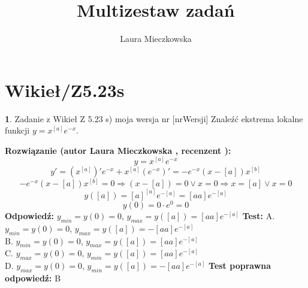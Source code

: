 \documentclass[12pt, a4paper]{article}
\title{Multizestaw zadań}
\author{Laura Mieczkowska}
\date{}
\theoremstyle{definition} %
\newtheorem{zad}{}
\newcommand{\kategoria}[1]{\section{#1}} %
\newcommand{\zadStart}[1]{\begin{zad}#1\newline} %
\newcommand{\zadStop}{\end{zad}}   %
\newcommand{\rozwStart}[2]{\noindent \textbf{Rozwiązanie (autor #1 , recenzent #2): }\newline} %
\newcommand{\odpStart}{\noindent \textbf{Odpowiedź:}\newline}    %
\newcommand{\odpStop}{\newline}                                             %
\newcommand{\testStart}{\noindent \textbf{Test:}\newline} %
\newcommand{\testStop}{\newline} %
\newcommand{\kluczStart}{\noindent \textbf{Test poprawna odpowiedź:}\newline} %
\newcommand{\kluczStop}{\newline} %
\begin{document}
\maketitle


\kategoria{Wikieł/Z5.23s}
\zadStart{Zadanie z Wikieł Z 5.23 s) moja wersja nr [nrWersji]}
Znaleźć ekstrema lokalne funkcji $y=x^{[a]}e^{-x}$.
\zadStop
\rozwStart{Laura Mieczkowska}{}
$$y=x^{[a]}e^{-x}$$
$$y'=(x^{[a]})'e^{-x}+x^{[a]}(e^{-x})'=-e^{-x}(x-[a])x^{[b]}$$
$$-e^{-x}(x-[a])x^{[b]}=0 \Rightarrow (x-[a])=0 \vee x=0 \Rightarrow x=[a] \vee x=0$$
$$y([a])=[a]^{[a]}e^{-[a]}=[aa]e^{-[a]}$$
$$y(0)=0\cdot e^{0}=0$$
\odpStart
$y_{min}=y(0)=0$, $y_{max}=y([a])=[aa]e^{-[a]}$
\odpStop
\testStart
A. $y_{min}=y(0)=0$, $y_{max}=y([a])=-[aa]e^{-[a]}$\\
B. $y_{min}=y(0)=0$, $y_{max}=y([a])=[aa]e^{-[a]}$ \\
C. $y_{max}=y(0)=0$, $y_{min}=y([a])=[aa]e^{-[a]}$ \\
D. $y_{max}=y(0)=0$, $y_{min}=y([a])=-[aa]e^{-[a]}$ 
\testStop
\kluczStart
B
\kluczStop
\end{document}
